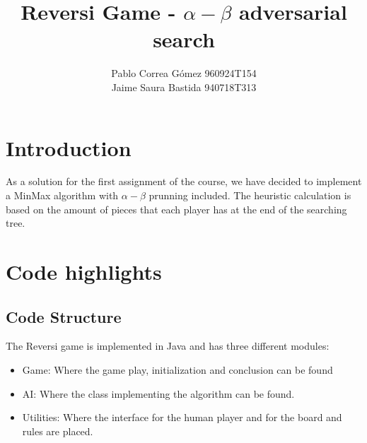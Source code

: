 \documentclass[]{report}
\title{Reversi Game - $\alpha-\beta$ adversarial search}
\author{Pablo Correa Gómez 960924T154 \\
		Jaime Saura Bastida 940718T313}
\begin{document}
\maketitle

\section*{Introduction}
	As a solution for the first assignment of the course, we have decided to implement a MinMax algorithm with $\alpha-\beta$ prunning included. The heuristic calculation is based on the amount of pieces that each player has at the end of the searching tree.

\section*{Code highlights}
	\subsection*{Code Structure}
		The Reversi game is implemented in Java and has three different modules:
		\begin{itemize}
			\item Game: Where the game play, initialization and conclusion can be found
			\item AI: Where the class implementing the algorithm can be found.
			\item Utilities: Where the interface for the human player and for the board and rules are placed.
		\end{itemize}
\end{document}
